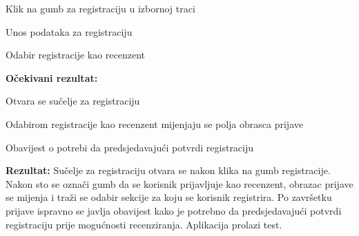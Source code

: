 			 \begin{packed_enum}
			 	\item {Klik na gumb za registraciju u izbornoj traci}
			 	\item {Unos podataka za registraciju}
			 	\item {Odabir registracije kao recenzent}
			 \end{packed_enum}

			 \textbf{Očekivani rezultat:}

			 \begin{packed_enum}
			 	\item {Otvara se sučelje za registraciju}
			 	\item {Odabirom registracije kao recenzent mijenjaju se polja obrasca prijave}
			 	\item {Obavijest o potrebi da predsjedavajući potvrdi registraciju}
			 \end{packed_enum}

			  \textbf{Rezultat: }Sučelje za registraciju otvara se nakon klika na gumb registracije. Nakon sto se označi gumb da se korisnik prijavljuje kao recenzent, obrazac prijave se mijenja i traži se odabir sekcije za koju se korisnik registrira. Po završetku prijave ispravno se javlja obavijest kako je potrebno da predsjedavajući potvrdi registraciju prije mogućnosti recenziranja. {\color{green} Aplikacija prolazi test.}
			  
